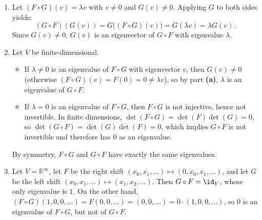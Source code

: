 \begin{exercisesolution}
\label{sol:eigenvalues_of_composed_endomorphisms}
\begin{enumerate}[label=\textbf{(\alph*)}]
    \item Let $(F \circ G)(v) = \lambda v$ with $v \ne 0$ and $G(v) \ne 0$.
    Applying $G$ to both sides yields:
    \[
    (G \circ F)(G(v)) = G\big((F \circ G)(v)\big) = G(\lambda v) = \lambda G(v).
    \]
    Since $G(v) \ne 0$, $G(v)$ is an eigenvector of $G \circ F$ with eigenvalue $\lambda$.

    \item Let $V$ be finite-di\-men\-sional.
    \begin{itemize}
        \item If $\lambda \ne 0$ is an eigenvalue of $F \circ G$ with eigenvector $v$, then $G(v) \ne 0$ (otherwise $(F \circ G)(v) = F(0) = 0 \ne \lambda v$), so by part \textbf{(a)}, $\lambda$ is an eigenvalue of $G \circ F$.
        \item If $\lambda = 0$ is an eigenvalue of $F \circ G$, then $F \circ G$ is not injective, hence not invertible. In finite dimensions, $\det(F \circ G) = \det(F) \det(G) = 0$, so $\det(G \circ F) = \det(G) \det(F) = 0$, which implies $G \circ F$ is not invertible and therefore has $0$ as an eigenvalue.
    \end{itemize}
    By symmetry, $F \circ G$ and $G \circ F$ have exactly the same eigenvalues.

    \item Let $V = \mathbb{R}^\infty$, let $F$ be the right shift $(x_0, x_1, \dots) \mapsto (0, x_0, x_1, \dots)$, and let $G$ be the left shift $(x_0, x_1, \dots) \mapsto (x_1, x_2, \dots)$.
    Then $G \circ F = \id_V$, whose only eigenvalue is $1$.
    On the other hand, $(F \circ G)(1, 0, 0, \dots) = F(0, 0, \dots) = (0, 0, \dots) = 0 \cdot (1, 0, 0, \dots)$, so $0$ is an eigenvalue of $F \circ G$, but not of $G \circ F$. \qedhere
\end{enumerate}
\end{exercisesolution}

